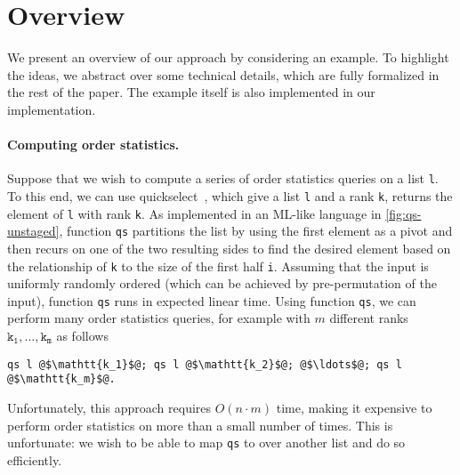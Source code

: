 
\section{Overview}
\label{sec:examplea}

We present an overview of our approach by considering an example.  To
highlight the ideas, we abstract over some technical details, which
are fully formalized in the rest of the paper.  The example itself is
also implemented in our implementation.

\paragraph{Computing order statistics.}

\begin{abstrsyn}



Suppose that we wish to compute a series of order statistics queries
on a list \texttt{l}. To this end, we can use
quickselect~\cite{Hoare:1961}, which give a list \texttt{l} and a rank
\texttt{k}, returns the element of \texttt{l} with rank \texttt{k}.
As implemented in an ML-like language in \ref{fig:qs-unstaged},
function \texttt{qs} partitions the list by using the first element as
a pivot and then recurs on one of the two resulting sides to find the
desired element based on the relationship of \texttt{k} to the size of
the first half \texttt{i}.  Assuming that the input is uniformly
randomly ordered (which can be achieved by pre-permutation of the
input), function \texttt{qs} runs in expected linear time.
%
Using function \texttt{qs}, we can perform many order statistics
queries, for example with $m$ different ranks
$\mathtt{k_1},\dots,\mathtt{k_m}$ as follows
%
\begin{lstlisting}
qs l @$\mathtt{k_1}$@; qs l @$\mathtt{k_2}$@; @$\ldots$@; qs l @$\mathtt{k_m}$@.
\end{lstlisting}
%
Unfortunately, this approach requires $O(n \cdot m)$ time, making it
expensive to perform order statistics on more than a small number of
times. This is unfortunate: we wish to be able to map \texttt{qs} to
over another list and do so efficiently.


\end{abstrsyn}
